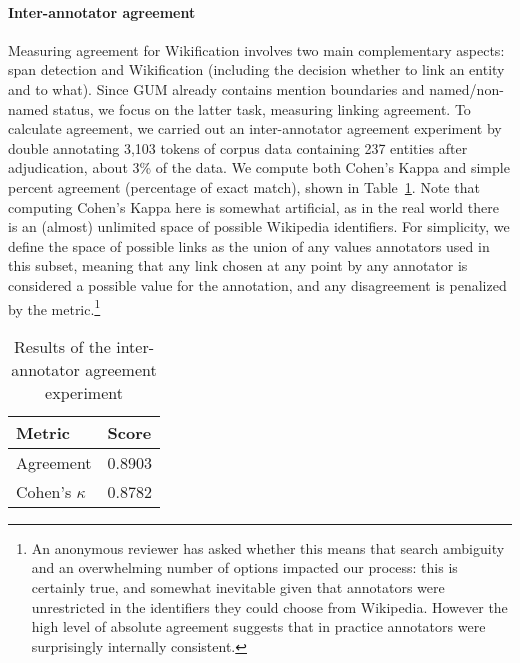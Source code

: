 \documentclass[11pt,a4paper]{article}
\begin{document}
\paragraph{Inter-annotator agreement} Measuring agreement for Wikification involves two main complementary aspects: span detection and Wikification (including the decision whether to link an entity and to what). Since GUM already contains mention boundaries and named/non-named status, we focus on the latter task, measuring linking agreement. To calculate agreement, we carried out an inter-annotator agreement experiment by double annotating 3,103 tokens of corpus data containing 237 entities after adjudication, about 3\% of the data. We compute both Cohen's Kappa and simple percent agreement (percentage of exact match), shown in Table~\ref{tb:3}. Note that computing Cohen's Kappa here is somewhat artificial, as in the real world there is an (almost) unlimited space of possible Wikipedia identifiers. For simplicity, we define the space of possible links as the union of any values annotators used in this subset, meaning that any link chosen at any point by any annotator is considered a possible value for the annotation, and any disagreement is penalized by the metric.\footnote{An anonymous reviewer has asked whether this means that search ambiguity and an overwhelming number of options impacted our process: this is certainly true, and somewhat inevitable given that annotators were unrestricted in the identifiers they could choose from Wikipedia. However the high level of absolute agreement suggests that in practice annotators were surprisingly internally consistent.}

\begin{table}[h!tb]
\begin{center}
\begin{tabular}{ l l } 
 \hline
 Metric & Score \\ 
 \hline
 Agreement & 0.8903  \\
 Cohen's $\kappa$ & 0.8782 \\
 \hline
\end{tabular}
\caption{Results of the inter-annotator agreement experiment}
\label{tb:3}
\end{center}
\end{table}
\end{document}
